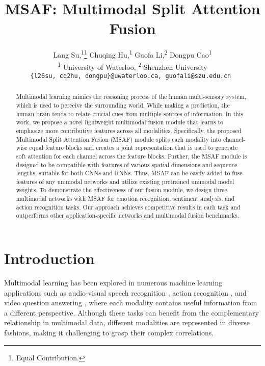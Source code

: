 \documentclass[10pt,twocolumn,letterpaper]{article}
\begin{document}
\title{MSAF: Multimodal Split Attention Fusion}

\author{
    Lang Su,\textsuperscript{\rm 1}\thanks{Equal Contribution.}\;
    Chuqing Hu,\textsuperscript{\rm 1}\footnotemark[1]\;
    Guofa Li,\textsuperscript{\rm 2} 
    Dongpu Cao\textsuperscript{\rm 1} 
    \\
    \textsuperscript{\rm 1} University of Waterloo, \textsuperscript{\rm 2} Shenzhen University\\
    \tt\small\{l26su, cq2hu, dongpu\}@uwaterloo.ca, guofali@szu.edu.cn
}

\maketitle
\ificcvfinal\thispagestyle{empty}\fi

\begin{abstract}
Multimodal learning mimics the reasoning process of the human multi-sensory system, which is used to perceive the surrounding world. While making a prediction, the human brain tends to relate crucial cues from multiple sources of information. In this work, we propose a novel lightweight multimodal fusion module that learns to emphasize more contributive features across all modalities. Specifically, the proposed Multimodal Split Attention Fusion (MSAF) module splits each modality into channel-wise equal feature blocks and creates a joint representation that is used to generate soft attention for each channel across the feature blocks. Further, the MSAF module is designed to be compatible with features of various spatial dimensions and sequence lengths, suitable for both CNNs and RNNs. Thus, MSAF can be easily added to fuse features of any unimodal networks and utilize existing pretrained unimodal model weights. To demonstrate the effectiveness of our fusion module, we design three multimodal networks with MSAF for emotion recognition, sentiment analysis, and action recognition tasks. Our approach achieves competitive results in each task and outperforms other application-specific networks and multimodal fusion benchmarks. 
\end{abstract}

\section{Introduction}
Multimodal learning has been explored in numerous machine learning applications such as audio-visual speech recognition \cite{neti2000audio}, action recognition \cite{baccouche2011sequential}, and video question answering \cite{lei2018tvqa}, where each modality contains useful information from a different perspective. Although these tasks can benefit from the complementary relationship in multimodal data, different modalities are represented in diverse fashions, making it challenging to grasp their complex correlations. 
\end{document}
